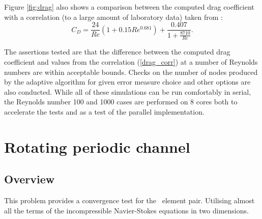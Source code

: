 Figure \ref{fig:drag} also shows a comparison between the computed drag coefficient with
a correlation (to a large amount of laboratory data) taken from \citet{brown2003}:
\begin{equation}
C_D = \frac{24}{Re}\left(1+0.15Re^{0.681}\right) + \frac{0.407}{1+\frac{8710}{Re}}.
\label{drag_corr}
\end{equation}

The assertions tested are that the difference between
the computed drag coefficient and values from the correlation 
(\ref{drag_corr}) at a number of Reynolds numbers are within acceptable bounds.
Checks on the number of nodes produced by the adaptive algorithm for 
given error measure choice and other options are also conducted. While
all of these simulations can be run comfortably in serial, the Reynolds 
number 100 and 1000 cases are performed on 8 cores both to accelerate the 
tests and as a test of the parallel implementation.







\section{Rotating periodic channel}
\label{sect:periodic_channel}

\subsection{Overview}

This problem provides a convergence test for the \PoDGPt\ element pair.
Utilising almost all the terms of the incompressible Navier-Stokes equations
in two dimensions.

